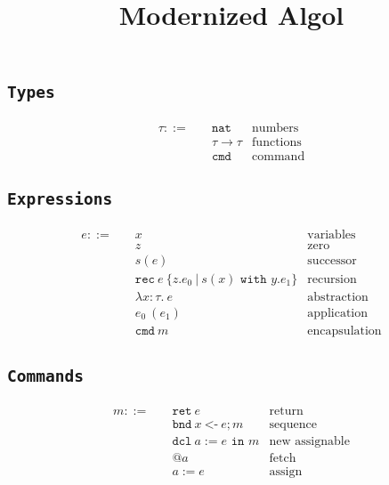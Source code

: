 \documentclass[11pt,a4paper]{article}
\title{Modernized Algol\footnotemark}
\date{}
\newcommand{\T}[1]{\texttt{#1}}
\begin{document}
\maketitle

\subsection*{\T{Types}}
\begin{align*}
  \tau ::=\quad &\T{nat}           &\text{numbers}\\
                &\tau \to \tau     &\text{functions} \\
                &\T{cmd}           &\text{command}
\end{align*}

\subsection*{\T{Expressions}}
\begin{align*}
  e ::=\quad    &x                    &\text{variables} \\
                &z                    &\text{zero}\\
                &s(e)                 &\text{successor}\\
                &\T{rec}\ e\ \{z .e_0\ |\ s(x) \T{ with } y.e_1\} &\text{recursion}\\
                &\lambda x : \tau.\ e       &\text{abstraction} \\
                &e_0\ (e_1)             &\text{application} \\
                &\T{cmd}\ m             &\text{encapsulation}
\end{align*}

\subsection*{\T{Commands}}
\begin{align*}
  m ::=\quad    &\T{ret}\ e                 &\text{return} \\
                &\T{bnd}\ x\ \T{<-}\ e; m   &\text{sequence} \\
                &\T{dcl}\ a := e \T{ in } m &\text{new assignable} \\
                &@a                         &\text{fetch} \\
                &a := e                     &\text{assign} 
\end{align*}


\end{document}
